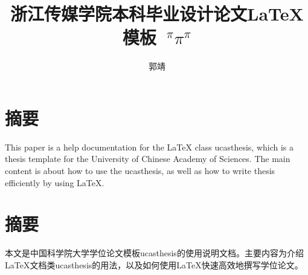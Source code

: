 \confidential{}%
\title{浙江传媒学院本科毕业设计论文\LaTeX{}模板 {$~^{\pi}\pi^{\pi}$}}%
\author{郭靖}%
\advisorsec{}%
\maketitle%
\makeenglishtitle%
\makedeclaration%
\nofootermatter
\chapter*{摘要}%

This paper is a help documentation for the \LaTeX{} class ucasthesis, which is  a thesis template for the University of Chinese Academy of Sciences. The main content is about how to use the ucasthesis, as well as how to write thesis efficiently by using \LaTeX{}.

\chapter*{摘要}%

本文是中国科学院大学学位论文模板ucasthesis的使用说明文档。主要内容为介绍\LaTeX{}文档类ucasthesis的用法，以及如何使用\LaTeX{}快速高效地撰写学位论文。

